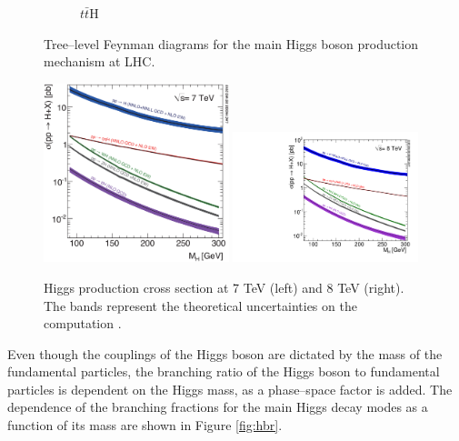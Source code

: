 \begin{figure}
\begin{subfigure}[b]{0.3\textwidth}
                \caption{$t\bar{t}$H}
                \label{fig:tth}
        \end{subfigure}
        \caption{Tree--level Feynman diagrams for the main Higgs boson production mechanism at LHC.}\label{fig:hprod}
\end{figure}

\begin{figure}
        \centering
	\includegraphics[width=0.48\textwidth]{1_Introduction_Th_and_Exp/pics/Higgs_XS_7TeV_LM.eps}
	\includegraphics[width=0.48\textwidth]{1_Introduction_Th_and_Exp/pics/Higgs_XS_8TeV_LM.pdf}
       \caption{Higgs production cross section at 7 TeV (left) and 8 TeV (right). The bands represent the theoretical uncertainties on the computation \cite{Heinemeyer:2013tqa}.}
       \label{fig:hxs}
\end{figure}


Even though the couplings of the Higgs boson are dictated by the mass of the fundamental particles, the branching ratio of the Higgs boson to fundamental particles is dependent on the Higgs mass, as a phase--space factor is added. The dependence of the branching fractions for the main Higgs decay modes as a function of its mass are shown in Figure \ref{fig:hbr}. 

